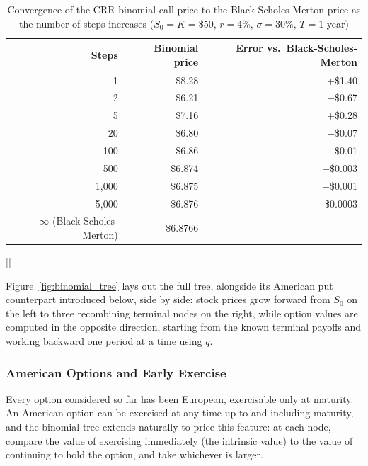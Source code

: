 \documentclass[../ai_in_finance]{subfiles}
\begin{document}
\begin{table}[htbp]
\centering
\begin{lrbox}{\bookmeasuredbox}
\begin{tabular}{rrr}
\toprule
Steps & Binomial price & Error vs.\ Black-Scholes-Merton \\
\midrule
1     & \$8.28 & +\$1.40 \\
2     & \$6.21 & $-$\$0.67 \\
5     & \$7.16 & +\$0.28 \\
20    & \$6.80 & $-$\$0.07 \\
100   & \$6.86 & $-$\$0.01 \\
500   & \$6.874 & $-$\$0.003 \\
1{,}000 & \$6.875 & $-$\$0.001 \\
5{,}000 & \$6.876 & $-$\$0.0003 \\
\midrule
$\infty$ (Black-Scholes-Merton) & \$6.8766 & --- \\
\bottomrule
\end{tabular}
\end{lrbox}
\ifdim\wd\bookmeasuredbox<0.65\linewidth
\setlength{\bookcapwidth}{0.65\linewidth}
\else
\setlength{\bookcapwidth}{\wd\bookmeasuredbox}
\fi
{}[\bookcapwidth]{
\usebox{\bookmeasuredbox}
}{
\caption{Convergence of the CRR binomial call price to the Black-Scholes-Merton price as the number of steps increases ($S_0=K=\$50$, $r=4\%$, $\sigma=30\%$, $T=1$ year)}
\label{tab:binomial_convergence}
}
\end{table}

Figure~\ref{fig:binomial_tree} lays out the full tree, alongside its American put counterpart introduced below, side by side: stock prices grow forward from $S_0$ on the left to three recombining terminal nodes on the right, while option values are computed in the opposite direction, starting from the known terminal payoffs and working backward one period at a time using $q$.

\subsubsection*{American Options and Early Exercise}
\label{sec:american-options}

Every option considered so far has been European, exercisable only at maturity. An American option can be exercised at any time up to and including maturity, and the binomial tree extends naturally to price this feature: at each node, compare the value of exercising immediately (the intrinsic value) to the value of continuing to hold the option, and take whichever is larger.
\end{document}
